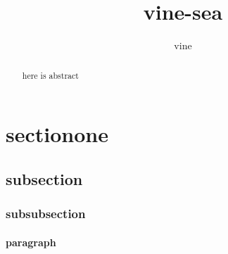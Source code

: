 \documentclass  {article}
\begin{document}
\title{vine-sea}
\author{vine}
\maketitle
\begin{abstract}
    here is abstract
\end{abstract}

\section{sectionone}
\subsection{subsection}
\subsubsection{subsubsection}
\paragraph{paragraph}


\end{document}
